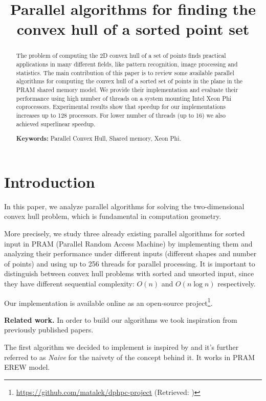 \documentclass[letterpaper]{article}
\title{Parallel algorithms for finding the convex hull of a sorted point set}
\newcommand{\mypar}[1]{{\bf #1.}}
\theoremstyle{definition}
\begin{document}
%
\maketitle
%

\begin{abstract}
The problem of computing the 2D convex hull of a set of points finds practical applications in many different fields, like pattern recognition, image processing and statistics.
The main contribution of this paper is to review some available parallel algorithms for computing the convex hull of a sorted set of points in the plane in the PRAM shared memory model.
We provide their implementation and evaluate their performance using high number of threads on a system mounting Intel Xeon Phi coprocessors.
Experimental results show that speedup for our implementations increases up to 128 processors.
For lower number of threads (up to 16) we also achieved superlinear speedup.

\textbf{Keywords:} Parallel Convex Hull, Shared memory, Xeon Phi.

\end{abstract}

\section{Introduction}\label{sec:intro}

In this paper, we analyze parallel algorithms for solving the two-dimensional convex hull problem, which is fundamental in computation geometry.

More precisely, we study three already existing parallel algorithms for sorted input in PRAM (Parallel Random Access Machine) by implementing them and analyzing their performance under different inputs (different shapes and number of points) and using up to 256 threads for parallel processing.
It is important to distinguish between convex hull problems with sorted and unsorted input, since they have different sequential complexity: $O(n)$ and $O(n\log n)$ respectively.

Our implementation is available online as an open-source project\footnote{\url{https://github.com/matalek/dphpc-project} (Retrieved: )}.

\mypar{Related work}
In order to build our algorithms we took inspiration from previously published papers.

The first algorithm we decided to implement is inspired by \cite{NaiveParallel} and it's further referred to as \textit{Naive} for the naivety of the concept behind it.
It works in PRAM EREW model.
\end{document}
